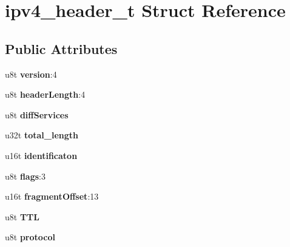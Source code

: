 \hypertarget{structipv4__header__t}{}\section{ipv4\+\_\+header\+\_\+t Struct Reference}
\label{structipv4__header__t}
\subsection*{Public Attributes}
\begin{DoxyCompactItemize}
\item 
\mbox{\label{structipv4__header__t_ac188d1ae5ea19139be084aabea16ecb1}} 
u8t {\bfseries version}\+:4
\item 
\mbox{\label{structipv4__header__t_ac11ce6acd566bf026316c761fc9532fd}} 
u8t {\bfseries header\+Length}\+:4
\item 
\mbox{\label{structipv4__header__t_a55f855624993b828721755ec8942256d}} 
u8t {\bfseries diff\+Services}
\item 
\mbox{\label{structipv4__header__t_a3503c52bc9b72749fb422fa108dd15f8}} 
u32t {\bfseries total\+\_\+length}
\item 
\mbox{\label{structipv4__header__t_a039763ed73f6968b0a6cecf4f144fe85}} 
u16t {\bfseries identificaton}
\item 
\mbox{\label{structipv4__header__t_a7865e9fdc047af71d5bf561256bc5081}} 
u8t {\bfseries flags}\+:3
\item 
\mbox{\label{structipv4__header__t_a5b4f68e31a631a875b616d6c389936ce}} 
u16t {\bfseries fragment\+Offset}\+:13
\item 
\mbox{\label{structipv4__header__t_a43c20799b97f008f7eb1226329078b89}} 
u8t {\bfseries T\+TL}
\item 
\mbox{\label{structipv4__header__t_abcb115504415c8546c24394f44037f5f}} 
u8t {\bfseries protocol}
\item 
\mbox{\label{structipv4__header__t_a056f1d4b637c9ac36f326690ab584ab3}} 

\end{DoxyCompactItemize}
